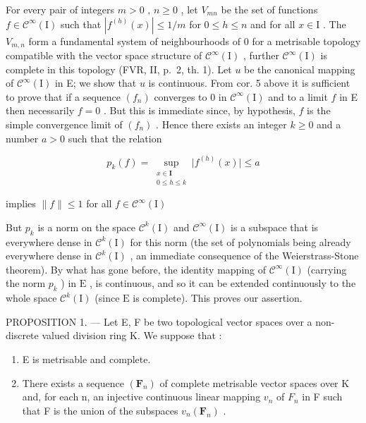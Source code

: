 For every pair of integers \(m > 0\) , \(n \geqslant 0\) , let \(V_{mn}\) be the set of functions \(f \in \mathcal{C}^{\infty}(\mathrm{I})\) such that \(|f^{(h)}(x)| \leqslant 1 / m\) for \(0 \leqslant h \leqslant n\) and for all \(x \in \mathrm{I}\) . The \(V_{m,n}\) form a fundamental system of neighbourhoods of 0 for a metrisable topology compatible with the vector space structure of \(\mathcal{C}^{\infty}(\mathrm{I})\) , further \(\mathcal{C}^{\infty}(\mathrm{I})\) is complete in this topology (FVR, II, p.~2, th. 1). Let \(u\) be the canonical mapping of \(\mathcal{C}^{\infty}(\mathrm{I})\) in E; we show that \(u\) is continuous. From cor. 5 above it is sufficient to prove that if a sequence \((f_n)\) converges to 0 in \(\mathcal{C}^{\infty}(\mathrm{I})\) and to a limit \(f\) in E then necessarily \(f = 0\) . But this is immediate since, by hypothesis, \(f\) is the simple convergence limit of \((f_n)\) . Hence there exists an integer \(k \geqslant 0\) and a number \(a > 0\) such that the relation

\[
p_{k}(f) = \sup_{\substack{x\in \mathbf{I}\\ 0\leqslant h\leqslant k}}\big|f^{(h)}(x)\big|\leqslant a
\]

implies \(\| f\| \leqslant 1\) for all \(f\in \mathcal{C}^{\infty}(\mathrm{I})\)

But \(p_k\) is a norm on the space \(\mathcal{C}^k(\mathrm{I})\) and \(\mathcal{C}^\infty(\mathrm{I})\) is a subspace that is everywhere dense in \(\mathcal{C}^k(\mathrm{I})\) for this norm (the set of polynomials being already everywhere dense in \(\mathcal{C}^k(\mathrm{I})\) , an immediate consequence of the Weierstrass-Stone theorem). By what has gone before, the identity mapping of \(\mathcal{C}^\infty(\mathrm{I})\) (carrying the norm \(p_k\) ) in \(\mathrm{E}\) , is continuous, and so it can be extended continuously to the whole space \(\mathcal{C}^k(\mathrm{I})\) (since \(\mathrm{E}\) is complete). This proves our assertion.

PROPOSITION 1. --- Let E, F be two topological vector spaces over a non-discrete valued division ring K. We suppose that :

\begin{enumerate}
\def\labelenumi{\arabic{enumi})}
\item
  E is metrisable and complete.
\item
  There exists a sequence \((\mathbf{F}_{n})\) of complete metrisable vector spaces over K and, for each n, an injective continuous linear mapping \(v_{n}\) of \(F_{n}\) in F such that F is the union of the subspaces \(v_{n}(\mathbf{F}_{n})\) .
\end{enumerate}

